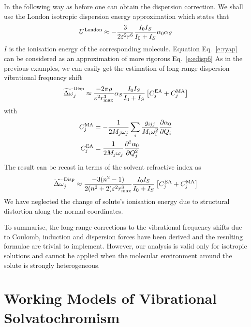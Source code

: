 \documentclass[a4paper,titlepage,twoside,fleqn,12pt]{book}
\newcommand{\fderiv}[2]{\ensuremath{
    \frac{\partial #1}{\partial #2}}}
\newcommand{\sderiv}[2]{\ensuremath{
    \frac{\partial^2 #1}{\partial #2^2}
    }}
\begin{document}
\begin{refsection}
In the following way as before one can obtain the
dispersion correction. We shall use the London isotropic
dispersion energy approximation which states that \citep{London.TransFaradSoc.1937}
%
\begin{equation} \label{e:ryap}
 U^{\rm London} \approx -\frac{3}{2\varepsilon^2 r^6} \frac{I_0I_S}{I_0+I_S} \alpha_0 \alpha_S
\end{equation}
%
$I$ is the ionisation energy of the corresponding
molecule. Equation Eq.~\eqref{e:ryap}
can be considered as an approximation of more rigorous Eq.~\eqref{e:edisp6}
As in the previous examples, we can easily get the estimation of
long\hyp{}range dispersion vibrational frequency shift
%
\begin{equation} \label{e:x123413}
 \widetilde{\Delta \omega}_j^{\rm Disp} \approx
\frac{-2\pi\rho}{\varepsilon^2 r_{\max}^3} \alpha_S \frac{I_0I_S}{I_0+I_S} \left[ C_j^{\rm EA} + C_j^{\rm MA} \right]
\end{equation}
%
with
%
\begin{subequations}
\begin{align}
  C_j^{\rm MA} &= -\frac{1}{2M_j\omega_j}\sum_i \frac{g_{ijj}}{M_i\omega_i^2} \fderiv{\alpha_0}{Q_i}\\
  C_j^{\rm EA} &= \frac{1}{2M_j\omega_j} \sderiv{\alpha_0}{Q_j}
\end{align}
\end{subequations}
%
The result
can be recast in terms of the solvent refractive index
as
%
\begin{equation} \label{e:x1234161}
 \widetilde{\Delta \omega}_j^{\rm Disp} \approx
\frac{-3(n^2-1)}{2(n^2+2)\varepsilon^2 r_{\max}^3} \frac{I_0I_S}{I_0+I_S} \left[ C_j^{\rm EA} + C_j^{\rm MA} \right]
\end{equation}
%
We have neglected the change of solute's ionisation energy due to structural
distortion along the normal coordinates. 

To summarise, the long\hyp{}range corrections to the vibrational
frequency shifts due to Coulomb, induction and dispersion forces
have been derived and the resulting formulae are trivial to implement.
However, our analysis is valid only for isotropic solutions and cannot be 
applied when the molecular environment around the solute is strongly heterogeneous.

\section{Working Models of Vibrational Solvatochromism\label{s:solx-models-working}}


\end{refsection}
\end{document}
